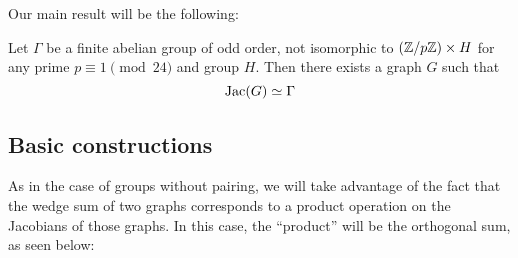 \documentclass{amsart}
\begin{document}
Our main result will be the following:

\begin{thm}
  \label{thm:graph_pairing}
  Let $\Gamma$ be a finite abelian group of odd order, not isomorphic
  to $(\mathbb{Z}/p\mathbb{Z}) \times H$ for any prime $p \equiv 1 \pmod {24}$ and
  group $H$. Then there exists a graph $G$ such that
  \[
  \operatorname{Jac}(G) \simeq \Gamma
  \]
\end{thm}

\subsection{Basic constructions}

As in the case of groups without pairing, we will take advantage of
the fact that the wedge sum of two graphs corresponds to a product
operation on the Jacobians of those graphs. In this case, the
``product'' will be the orthogonal sum, as seen below:
\end{document}

